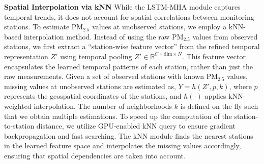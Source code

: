\noindent\textbf{Spatial Interpolation via kNN}
While the LSTM-MHA module captures temporal trends, it does not account for spatial correlations between monitoring stations. To estimate PM\(_{2.5}\) values at unobserved stations, we employ a kNN-based interpolation method. Instead of using the raw PM\(_{2.5}\) values from observed stations, we first extract a ``station-wise feature vector'' from the refined temporal representation $Z'$ using temporal pooling $Z' \in \mathbb{R}^{C\times \text{dim} \times N}$. This feature vector encapsulates the learned temporal patterns of each station, rather than just the raw measurements. Given a set of observed stations with known PM\(_{2.5}\) values, missing values at unobserved stations are estimated as, $Y = h(Z', p, k)$, where $p$ represents the geospatial coordinates of the stations, and $h(\cdot)$ applies kNN-weighted interpolation. The number of neighborhoods $k$ is defined on the fly such that we obtain multiple estimations. To speed up the computation of the station-to-station distance, we utilize GPU-enabled kNN query to ensure gradient backpropagation and fast searching. The kNN module finds the nearest stations in the learned feature space and interpolates the missing values accordingly, ensuring that spatial dependencies are taken into account.
